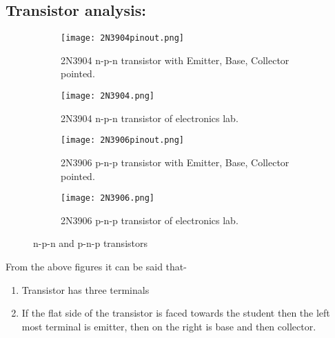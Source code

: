\documentclass[a4paper, 14pt]{extarticle}
\begin{document}
        \subsection{Transistor analysis:}
        \vspace{20pt}
            \begin{figure}[h]
                \centering
                \begin{subfigure}[h]{0.4\textwidth} %
                    \texttt{[image: 2N3904pinout.png]}
                    \caption{2N3904 n-p-n transistor with Emitter, Base, Collector pointed.}
                    \label{fig:subfig1}
                \end{subfigure}
                \hfill
                \begin{subfigure}[h]{0.4\textwidth} %
                \centering
                    \texttt{[image: 2N3904.png]}
                    \caption{2N3904 n-p-n transistor of electronics lab.}
                    \label{fig:subfig2}
                \end{subfigure}
                \vspace{20pt} 
                \begin{subfigure}[h]{0.4\textwidth} %
                    \texttt{[image: 2N3906pinout.png]}
                    \caption{2N3906 p-n-p transistor with Emitter, Base, Collector pointed.}
                    \label{fig:subfig3}
                \end{subfigure}
                \hfill
                \begin{subfigure}[h]{0.4\textwidth} %
                    \texttt{[image: 2N3906.png]}
                    \caption{2N3906 p-n-p transistor of electronics lab.}
                    \label{fig:subfig4}
                \end{subfigure}
                \vspace{10pt}
                \caption{n-p-n and p-n-p transistors}
                \label{mainfig1}
            \end{figure}
            From the above figures it can be said that-
            \begin{enumerate}
                \item Transistor has three terminals
                \item If the flat side of the transistor is faced towards the student then the left most terminal is emitter, then on the right is base and then collector.
            \end{enumerate}
            
\end{document}

